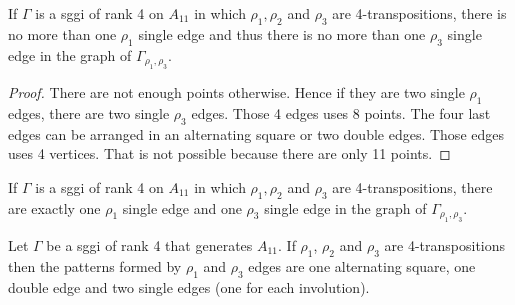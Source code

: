 \begin{lemma}
    If $\Gamma$ is a sggi of rank 4 on $A_{11}$ in which $\rho_1, \rho_2$ and $\rho_3$ are 4-transpositions, there is no more than one $\rho_1$ single edge and thus there is no more than one $\rho_3$ single edge in the graph of $\Gamma_{\rho_1, \rho_3}$.
\end{lemma}

\begin{proof}
  There are not enough points otherwise. Hence if they are two single $\rho_1$ edges, there are two single $\rho_3$ edges. Those 4 edges uses 8 points. The four last edges can be arranged in an alternating square or two double edges. Those edges uses 4 vertices. That is not possible because there are only 11 points.
\end{proof}

\begin{corollary}
  \label{rank-4-single-1}
    If $\Gamma$ is a sggi of rank 4 on $A_{11}$ in which $\rho_1, \rho_2$ and $\rho_3$ are 4-transpositions, there are exactly one $\rho_1$ single edge and one $\rho_3$ single edge in the graph of $\Gamma_{\rho_1, \rho_3}$.
\end{corollary}

\begin{lemma}
  \label{rank-4-3-patterns}
  Let $\Gamma$ be a sggi of rank 4 that generates $A_{11}$. If $\rho_1$, $\rho_2$ and $\rho_3$ are 4-transpositions then the patterns formed by $\rho_1$ and $\rho_3$ edges are one alternating square, one double edge and two single edges (one for each involution).
\end{lemma}

